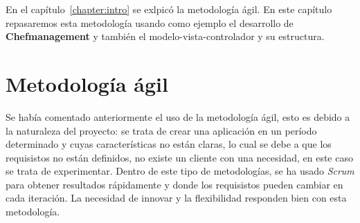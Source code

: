 
En el capítulo~\ref{chapter:intro} se exlpicó la metodología ágil. En este capítulo repasaremos esta metodología usando como ejemplo el desarrollo de \textbf{Chefmanagement} y también el modelo-vista-controlador y su estructura.

\vspace*{0.2in}
\section{Metodología ágil}\label{cap.4.1}

Se había comentado anteriormente el uso de la metodología ágil, esto es debido a la naturaleza del proyecto: se trata de crear una aplicación en un período determinado y cuyas características no están claras, lo cual se debe a que los requisistos no están definidos, no existe un cliente con una necesidad, en este caso se trata de experimentar. Dentro de este tipo de metodologías, se ha usado \emph{Scrum} para obtener resultados rápidamente y donde los requisistos pueden cambiar en cada iteración. La necesidad de innovar y la flexibilidad responden bien con esta metodología. \\

